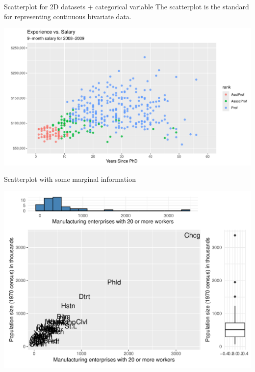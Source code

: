 \documentclass[11pt,handout,aspectratio=169]{beamer}
\begin{document}
\begin{frame}[fragile]{Scatterplot for 2D datasets + categorical variable}
	The scatterplot is the standard for representing continuous bivariate data.
	{\scriptsize
\begin{center}
\includegraphics[width=.7\textwidth]{pics/plot1.2.pdf}		
\end{center}}
\end{frame}

\begin{frame}[fragile]{Scatterplot with some marginal information}
\begin{center}
\includegraphics[width=.75\textwidth]{pics/plot1.3.pdf}		
\end{center}
\end{frame}
\end{document}
